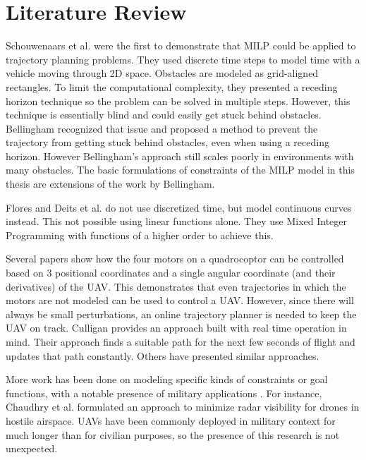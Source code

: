 \section{Literature Review}
\label{subsec:previous}
Schouwenaars et al.\cite{Schouwenaars2001} were the first to demonstrate that MILP could be applied to trajectory planning problems. They used discrete time steps to model time with a vehicle moving through 2D space. Obstacles are modeled as grid-aligned rectangles. To limit the computational complexity, they presented a receding horizon technique so the problem can be solved in multiple steps. However, this technique is essentially blind and could easily get stuck behind obstacles. Bellingham\cite{Bellingham2002} recognized that issue and proposed a method to prevent the trajectory from getting stuck behind obstacles, even when using a receding horizon. However Bellingham's approach still scales poorly in environments with many obstacles. The basic formulations of constraints of the MILP model in this thesis are extensions of the work by Bellingham.
\par
Flores\cite{Flores2007} and Deits et al.\cite{Deits2015} do not use discretized time, but model continuous curves instead. This not possible using linear functions alone. They use Mixed Integer Programming with functions of a higher order to achieve this. 
\par
Several papers \cite{Fliess1995a, Hao2005, Cowling2007, Mellinger2011} show how the four motors on a quadrocoptor can be controlled based on 3 positional coordinates and a single angular coordinate (and their derivatives) of the UAV. This demonstrates that even trajectories in which the motors are not modeled can be used to control a UAV. However, since there will always be small perturbations, an online trajectory planner is needed to keep the UAV on track. Culligan \cite{Culligan2006} provides an approach built with real time operation in mind. Their approach finds a suitable path for the next few seconds of flight and updates that path constantly. Others \cite{Kamal2005} \cite{Luders2008} have presented similar approaches.
\par
More work has been done on modeling specific kinds of constraints or goal functions, with a notable presence of military applications \cite{Maillot2015}\cite{Chaudhuri2015}. For instance, Chaudhry et al. \cite{Chaudhry2004} formulated an approach to minimize radar visibility for drones in hostile airspace. UAVs have been  commonly deployed in military context for much longer than for civilian purposes, so the presence of this research is not unexpected.
